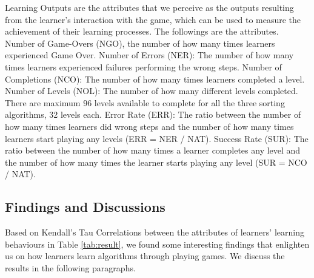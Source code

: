 \documentclass[conference]{IEEEtran}
\begin{document}
Learning Outputs are the attributes that we perceive as the outputs resulting from the learner’s interaction with the game, which can be used to measure the achievement of their learning processes. The followings are the attributes. Number of Game-Overs (NGO), the number of how many times learners experienced Game Over. Number of Errors (NER): The number of how many times learners experienced failures performing the wrong steps. Number of Completions (NCO): The number of how many times learners completed a level. Number of Levels (NOL): The number of how many different levels completed. There are maximum 96 levels available to complete for all the three sorting algorithms, 32 levels each. Error Rate (ERR): The ratio between the number of how many times learners did wrong steps and the number of how many times learners start playing any levels (ERR = NER / NAT).  Success Rate (SUR): The ratio between the number of how many times a learner completes any level and the number of how many times the learner starts playing any level (SUR = NCO / NAT).


\subsection{Findings and Discussions}
\label{sec:findings_and_discussions}

Based on Kendall’s Tau Correlations between the attributes of learners’ learning behaviours in Table \ref{tab:result}, we found some interesting findings that enlighten us on how learners learn algorithms through playing games. We discuss the results in the following paragraphs.
\end{document}
